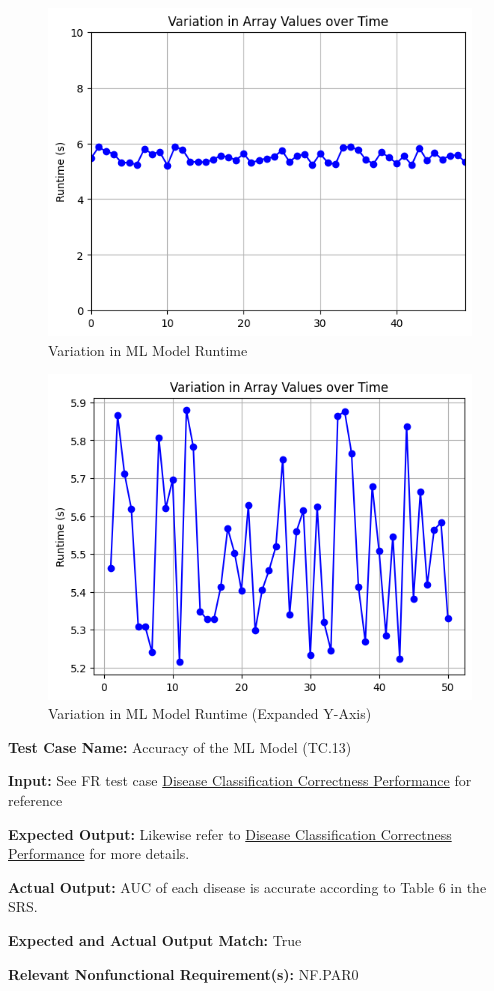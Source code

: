 \documentclass[12pt, titlepage]{article}
\begin{document}
\begin{mdframed}[linewidth=0.5mm]
  \begin{figure}[H]
      \centering
      \includegraphics[width=0.75\linewidth]{output1.png}
      \caption{Variation in ML Model Runtime}
      \label{fig:enter-label}
  \end{figure}
  \begin{figure}[H]
      \centering
      \includegraphics[width=0.75\linewidth]{output2.png}
      \caption{Variation in ML Model Runtime (Expanded Y-Axis)}
      \label{fig:enter-label}
  \end{figure}
\end{mdframed}

\begin{mdframed}[linewidth=0.5mm]
  \textbf{Test Case Name:} Accuracy of the ML Model (TC.13) \par
  \textbf{Input:} See FR test case \hyperlink{disClasCorPerf}{Disease Classification Correctness Performance} for reference \par
  \textbf{Expected Output:} Likewise refer to \hyperlink{disClasCorPerf}{Disease Classification Correctness Performance} for more details. \par
  \textbf{Actual Output:} AUC of each disease is accurate according to Table 6 in the SRS. \par
  \textbf{Expected and Actual Output Match:} True \par
  \textbf{Relevant Nonfunctional Requirement(s):} NF.PAR0
\end{mdframed}
\end{document}
